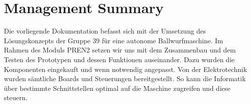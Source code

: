 \section{Management Summary}
Die vorliegende Dokumentation befasst sich mit der Umsetzung des Lösungskonzepts der Gruppe 39 für eine autonome Ballwurfmaschine.
Im Rahmen des Moduls PREN2 setzen wir uns mit dem Zusammenbau und dem Testen des Prototypen und dessen Funktionen auseinander.
Dazu wurden die Komponenten eingekauft und wenn notwendig angepasst. Von der Elektrotechnik wurden sämtliche Boards und Steuerungen bereitgestellt.
So kann die Informatik über bestimmte Schnittstellen optimal auf die Maschine zugreifen und diese steuern.